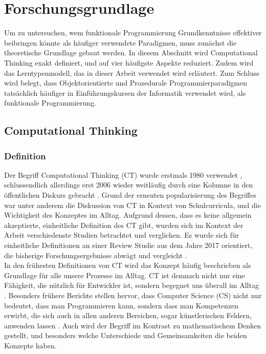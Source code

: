 \clearpage
\section{Forschungsgrundlage}
\label{sec:research}

Um zu untersuchen, wem funktionale Programmierung Grundkenntnisse effektiver beibringen könnte als häufiger verwendete Paradigmen, muss zunächst die theoretische Grundlage gebaut werden. In diesem Abschnitt wird Computational Thinking exakt definiert, und auf vier häufigste Aspekte reduziert. Zudem wird das Lerntypenmodell, das in dieser Arbeit verwendet wird erläutert. Zum Schluss wird belegt, dass Objektorientierte und Prozedurale Programmierparadigmen tatsächlich häufiger in Einführungskursen der Informatik verwendet wird, als funktionale Programmierung.

\subsection{Computational Thinking}

\subsubsection{Definition}
Der Begriff Computational Thinking (CT) wurde erstmals 1980 verwendet \cite{papert}, schlussendlich allerdings erst 2006 wieder weitläufig durch eine Kolumne in den öffentlichen Diskurs gebracht \cite{wing2006}.
Grund der erneuten popularisierung des Begriffes war unter anderem die Diskussion von CT in Kontext von Schulcurricula, und die Wichtigkeit des Konzeptes im Alltag.
Aufgrund dessen, dass es keine allgemein akzeptierte, einheitliche Definition des CT gibt, wurden sich im Kontext der Arbeit verschiedenste Studien betrachtet und verglichen. Es wurde sich für einheitliche Definitionen an einer Review Studie aus dem Jahre 2017 orientiert, die bisherige Forschungsergebnisse abwägt und vergleicht \cite{schute}.
\\
In den frühesten Definitionen von CT wird das Konzept häufig beschrieben als Grundlage für alle unsere Prozesse im Alltag. CT ist demnach nicht nur eine Fähigkeit, die nützlich für Entwickler ist, sondern begegnet uns überall im Alltag \cite{khine17}. Besonders frühere Berichte stellen hervor, dass Computer Science (CS) nicht nur bedeutet, dass man Programmieren kann, sondern dass man Kompetenzen erwirbt, die sich auch in allen anderen Bereichen, sogar künstlerischen Feldern, anwenden lassen \cite{wing2006}.
Auch wird der Begriff im Kontrast zu mathematischem Denken gestellt, und besonders welche Unterschiede und Gemeinsamkeiten die beiden Konzepte haben.

